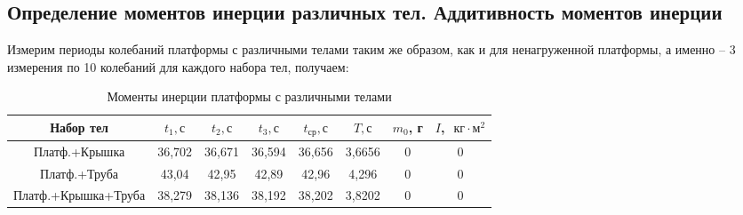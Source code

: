\documentclass[a4paper,12pt]{article}
\begin{document}
\subsection*{Определение моментов инерции различных тел. Аддитивность моментов инерции}
    Измерим периоды колебаний платформы с различными телами таким же образом, как и для ненагруженной платформы, а именно -- 3 измерения по 10 колебаний для каждого набора тел, получаем:
	\begin{table}[H]
        \begin{center}
            \begin{tabular}{|c|c|c|c|c|c|c|c|}
                \hline 
                Набор тел & $t_1, с$ & $t_2, с$ & $t_3, с$ & $t_\text{ср}, с$ & $T, с$ & $m_0$, г & $I$, $\text{ кг} \cdot \text{м}^2$\\
                \hline
                Платф.+Крышка & 36,702 & 36,671 & 36,594 &  36,656  & 3,6656 & 0 & 0\\
                \hline 
                Платф.+Труба & 43,04 & 42,95 & 42,89 & 42,96 & 4,296 & 0 & 0\\
                \hline 
                Платф.+Крышка+Труба & 38,279 & 38,136 & 38,192 & 38,202 & 3,8202 & 0 & 0\\
                \hline 
            \end{tabular}
            \caption{Моменты инерции платформы с различными телами}
        \end{center}
    \end{table} 

     
\end{document}
